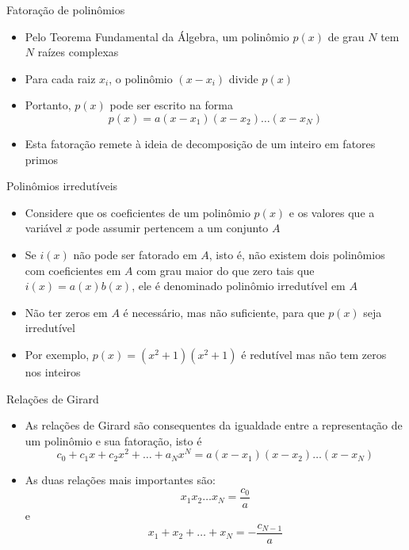 \begin{frame}[fragile]{Fatoração de polinômios}

    \begin{itemize}
        \item Pelo Teorema Fundamental da Álgebra, um polinômio $p(x)$ de grau $N$ tem $N$ raízes complexas

        \item Para cada raiz $x_i$, o polinômio $(x - x_i)$ divide $p(x)$

        \item Portanto, $p(x)$ pode ser escrito na forma
$$
    p(x) = a(x - x_1)(x - x_2)\ldots (x - x_N)
$$

        \item Esta fatoração remete à ideia de decomposição de um inteiro em fatores primos
    \end{itemize}

\end{frame}

\begin{frame}[fragile]{Polinômios irredutíveis}

    \begin{itemize}
        \item Considere que os coeficientes de um polinômio $p(x)$ e os valores que a variável $x$ pode assumir pertencem a um conjunto $A$

        \item Se $i(x)$ não pode ser fatorado em $A$, isto é, não existem dois polinômios com coeficientes em $A$ com grau maior do que zero tais que $i(x) = a(x)b(x)$, ele é denominado polinômio irredutível em $A$

        \item Não ter zeros em $A$ é necessário, mas não suficiente, para que $p(x)$ seja irredutível

        \item Por exemplo, $p(x) = (x^2 + 1)(x^2 + 1)$ é redutível mas não tem zeros nos inteiros
    \end{itemize}

\end{frame}

\begin{frame}[fragile]{Relações de Girard}

    \begin{itemize}
        \item As relações de Girard são consequentes da igualdade entre a representação de um polinômio e sua fatoração, isto é
$$
    c_0 + c_1x + c_2x^2 + \ldots + a_Nx^N = a(x - x_1)(x - x_2) \ldots (x - x_N)
$$

        \item As duas relações mais importantes são:
$$
    x_1x_2\ldots x_N = \frac{c_0}{a}
$$
e
$$
    x_1 + x_2 + \ldots + x_N = - \frac{c_{N - 1}}{a}
$$
    \end{itemize}

\end{frame}

